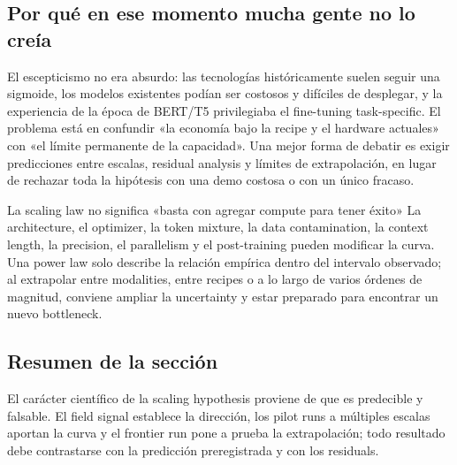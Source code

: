 
\subsection{Por qué en ese momento mucha gente no lo creía}

El escepticismo no era absurdo: las tecnologías históricamente suelen seguir una sigmoide, los modelos existentes podían ser costosos y difíciles de desplegar, y la experiencia de la época de BERT/T5 privilegiaba el fine-tuning task-specific. El problema está en confundir «la economía bajo la recipe y el hardware actuales» con «el límite permanente de la capacidad». Una mejor forma de debatir es exigir predicciones entre escalas, residual analysis y límites de extrapolación, en lugar de rechazar toda la hipótesis con una demo costosa o con un único fracaso.

\begin{warningbox}{La scaling law no significa «basta con agregar compute para tener éxito»}
La architecture, el optimizer, la token mixture, la data contamination, la context length, la precision, el parallelism y el post-training pueden modificar la curva. Una power law solo describe la relación empírica dentro del intervalo observado; al extrapolar entre modalities, entre recipes o a lo largo de varios órdenes de magnitud, conviene ampliar la uncertainty y estar preparado para encontrar un nuevo bottleneck.
\end{warningbox}

\subsection{Resumen de la sección}

El carácter científico de la scaling hypothesis proviene de que es predecible y falsable. El field signal establece la dirección, los pilot runs a múltiples escalas aportan la curva y el frontier run pone a prueba la extrapolación; todo resultado debe contrastarse con la predicción preregistrada y con los residuals.
